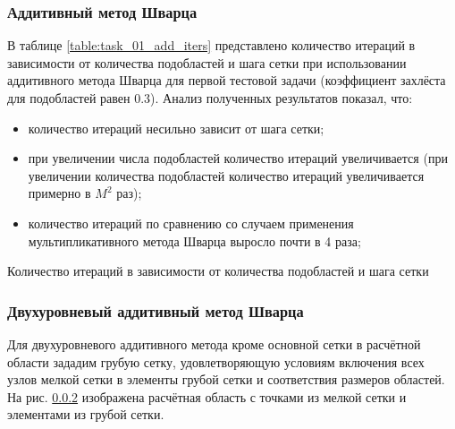 \documentclass[a4paper]{article}
\begin{document}
\newpage

\subsubsection{Аддитивный метод Шварца}

В таблице \ref{table:task_01_add_iters} представлено количество итераций в зависимости от количества подобластей и шага сетки при использовании аддитивного метода Шварца для первой тестовой задачи (коэффициент захлёста для подобластей равен 0.3). Анализ полученных результатов показал, что:
\begin{itemize}
\item количество итераций несильно зависит от шага сетки;
\item при увеличении числа подобластей количество итераций увеличивается (при увеличении количества подобластей количество итераций увеличивается примерно в $M^2$ раз);
\item количество итераций по сравнению со случаем применения мультипликативного метода Шварца выросло почти в 4 раза;
\end{itemize}

\begin{table}[h]
\caption{Количество итераций в зависимости от количества подобластей и шага сетки}
\label{table:task_01_add_iters}
\end{table}

\newpage

\subsubsection{Двухуровневый аддитивный метод Шварца}
Для двухуровневого аддитивного метода кроме основной сетки в расчётной области зададим грубую сетку, удовлетворяющую условиям включения всех узлов мелкой сетки в элементы грубой сетки и соответствия размеров областей. На рис. \ref{} изображена расчётная область с точками из мелкой сетки и элементами из грубой сетки.
\end{document}

